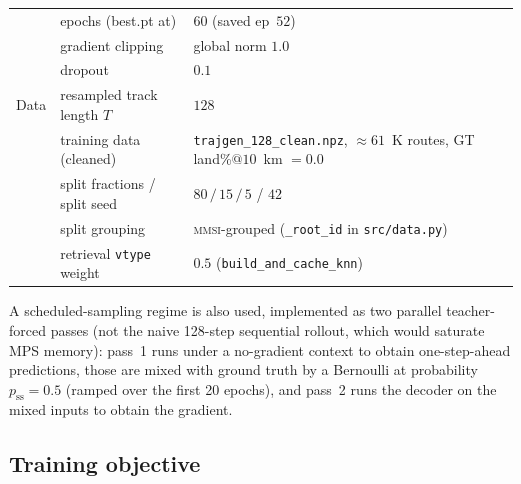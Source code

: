 \documentclass[oneside, a4paper, onecolumn, 11pt]{article}
\begin{document}
\begin{table}[h]
\begin{tabular}{lll}
             & epochs (best.pt at)             & $60$ (saved ep~$52$) \\
             & gradient clipping               & global norm $1.0$ \\
             & dropout                         & $0.1$ \\
\midrule
Data         & resampled track length $T$      & $128$ \\
             & training data (cleaned)         & \texttt{trajgen\_128\_clean.npz},
                                                 $\approx 61$~K routes,
                                                 GT land\%$@10$~km $=0.0$ \\
             & split fractions / split seed    & $80\,/\,15\,/\,5$ / $42$ \\
             & split grouping                  & \textsc{mmsi}-grouped
                                                 (\texttt{\_root\_id} in
                                                  \texttt{src/data.py}) \\
             & retrieval \texttt{vtype} weight & $0.5$
                                                 (\texttt{build\_and\_cache\_knn}) \\
\bottomrule
\end{tabular}
\end{table}

A scheduled-sampling regime is also used, implemented as two parallel
teacher-forced passes (not the naive 128-step sequential rollout, which
would saturate MPS memory): pass~1 runs under a no-gradient context to
obtain one-step-ahead predictions, those are mixed with ground truth by
a Bernoulli at probability $p_{\mathrm{ss}} = 0.5$ (ramped over the
first 20 epochs), and pass~2 runs the decoder on the mixed inputs to
obtain the gradient.

\subsection{Training objective}\label{sec:loss}
\end{document}
